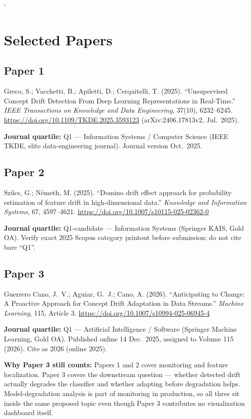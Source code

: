 `\documentclass[10pt]{article}
\begin{document}
\section{Selected Papers}

\subsection*{Paper 1}
Greco, S.; Vacchetti, B.; Apiletti, D.; Cerquitelli, T. (2025). \enquote{Unsupervised Concept Drift Detection From Deep Learning Representations in Real-Time.} \textit{IEEE Transactions on Knowledge and Data Engineering}, 37(10), 6232--6245. \url{https://doi.org/10.1109/TKDE.2025.3593123} (arXiv:2406.17813v2, Jul.\ 2025).

\noindent\textbf{Journal quartile:} Q1 --- Information Systems / Computer Science (IEEE TKDE, elite data-engineering journal). Journal version Oct.\ 2025.

\subsection*{Paper 2}
Sz\H{u}cs, G.; N\'emeth, M. (2025). \enquote{Domino drift effect approach for probability estimation of feature drift in high-dimensional data.} \textit{Knowledge and Information Systems}, 67, 4597--4621. \url{https://doi.org/10.1007/s10115-025-02362-0}

\noindent\textbf{Journal quartile:} Q1-candidate --- Information Systems (Springer KAIS, Gold OA). Verify exact 2025 Scopus category printout before submission; do not cite bare ``Q1''.

\subsection*{Paper 3}
Guerrero Cano, J.~V.; Aguiar, G.~J.; Cano, A. (2026). \enquote{Anticipating to Change: A Proactive Approach for Concept Drift Adaptation in Data Streams.} \textit{Machine Learning}, 115, Article 3. \url{https://doi.org/10.1007/s10994-025-06945-4}

\noindent\textbf{Journal quartile:} Q1 --- Artificial Intelligence / Software (Springer Machine Learning, Gold OA). Published online 14 Dec.\ 2025, assigned to Volume 115 (2026). Cite as 2026 (online 2025).

\medskip
\noindent\textbf{Why Paper 3 still counts:} Papers 1 and 2 cover monitoring and feature localization. Paper 3 covers the downstream question --- whether detected drift actually degrades the classifier and whether adapting before degradation helps. Model-degradation analysis is part of monitoring in production, so all three sit inside the same proposed topic even though Paper 3 contributes no visualization dashboard itself.
\end{document}
